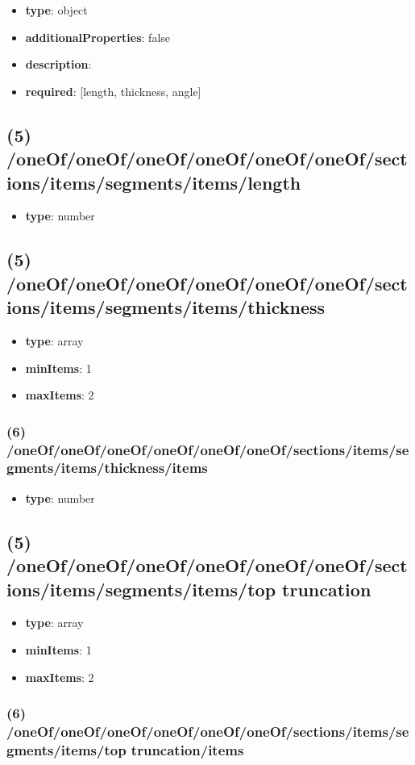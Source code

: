\begin{itemize}[leftmargin=4em]\item {\bf type}: object
\item {\bf additionalProperties}: false
\item {\bf description}: 
\item {\bf required}: [length, thickness, angle]\end{itemize}
\subsection{(5) /oneOf/oneOf/oneOf/oneOf/oneOf/oneOf/sections/items/segments/items/length}
\begin{itemize}[leftmargin=5em]\item {\bf type}: number
\end{itemize}\subsection{(5) /oneOf/oneOf/oneOf/oneOf/oneOf/oneOf/sections/items/segments/items/thickness}
\begin{itemize}[leftmargin=5em]\item {\bf type}: array
\item {\bf minItems}: 1
\item {\bf maxItems}: 2
\end{itemize}\subsubsection{(6) /oneOf/oneOf/oneOf/oneOf/oneOf/oneOf/sections/items/segments/items/thickness/items}
\begin{itemize}[leftmargin=6em]\item {\bf type}: number
\end{itemize}\subsection{(5) /oneOf/oneOf/oneOf/oneOf/oneOf/oneOf/sections/items/segments/items/top truncation}
\begin{itemize}[leftmargin=5em]\item {\bf type}: array
\item {\bf minItems}: 1
\item {\bf maxItems}: 2
\end{itemize}\subsubsection{(6) /oneOf/oneOf/oneOf/oneOf/oneOf/oneOf/sections/items/segments/items/top truncation/items}
